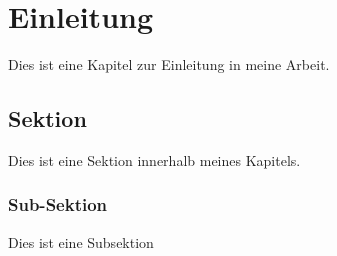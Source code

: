 \chapter{Einleitung}
Dies ist eine Kapitel zur Einleitung in meine Arbeit.

\section{Sektion}
Dies ist eine Sektion innerhalb meines Kapitels.

\subsection{Sub-Sektion}
Dies ist eine Subsektion